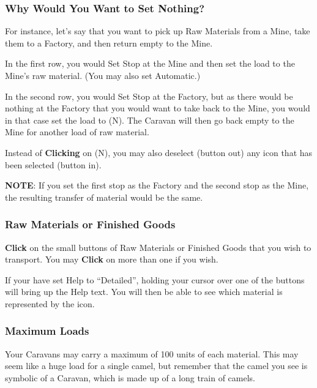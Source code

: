 \subsubsection{Why Would You Want to Set Nothing?}


For instance, let’s say that you want to pick up Raw Materials from a Mine, take them to a Factory, and then return empty to the Mine.


\begin{changemargin}{.5cm}{0cm}
In the first row, you would Set Stop at the Mine and then set the load to the Mine’s raw material. (You may also set Automatic.)

In the second row, you would Set Stop at the Factory, but as there would be nothing at the Factory that you would want to take back to the Mine, you would in that case set the load to (N). The Caravan will then go back empty to the Mine for another load of raw material.


Instead of \textbf{Clicking} on (N), you may also deselect (button out) any icon that has been selected (button in).
\end{changemargin}

\textbf{NOTE}: If you set the first stop as the Factory and the second stop as the Mine, the resulting transfer of material would be the same.

\subsubsection{Raw Materials or Finished Goods}

\textbf{Click} on the small buttons of Raw Materials or Finished Goods that you wish to transport. You may \textbf{Click} on more than one if you wish.


If your have set Help to “Detailed”, holding your cursor over one of the buttons will bring up the Help text. You will then be able to see which material is represented by the icon.

\subsubsection{Maximum Loads}

Your Caravans may carry a maximum of 100 units of each material. This may seem like a huge load for a single camel, but remember that the camel you see is symbolic of a Caravan, which is made up of a long train of camels.

